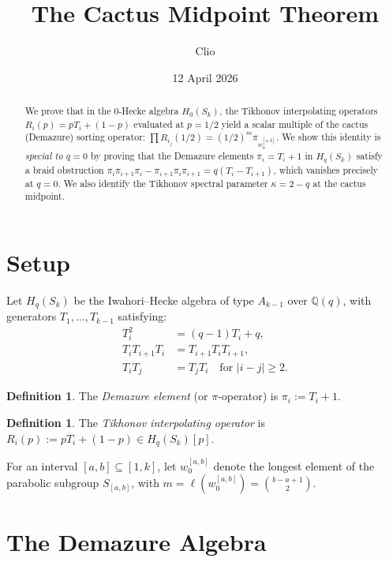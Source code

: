 \documentclass[11pt]{article}
\title{The Cactus Midpoint Theorem}
\author{Clio}
\date{12 April 2026}
\theoremstyle{definition}
\newtheorem{definition}[theorem]{Definition}
\theoremstyle{remark}
\begin{document}
\maketitle

\begin{abstract}
We prove that in the 0-Hecke algebra $H_0(S_k)$, the Tikhonov interpolating
operators $R_i(p) = pT_i + (1-p)$ evaluated at $p = 1/2$ yield a scalar
multiple of the cactus (Demazure) sorting operator:
$\prod R_{i_j}(1/2) = (1/2)^m \pi_{w_0^{[a,b]}}$. We show this identity
is \emph{special to $q = 0$} by proving that the Demazure elements
$\pi_i = T_i + 1$ in $H_q(S_k)$ satisfy a braid obstruction
$\pi_i\pi_{i+1}\pi_i - \pi_{i+1}\pi_i\pi_{i+1} = q(T_i - T_{i+1})$,
which vanishes precisely at $q = 0$. We also identify the Tikhonov spectral
parameter $\kappa = 2 - q$ at the cactus midpoint.
\end{abstract}

\section{Setup}

Let $H_q(S_k)$ be the Iwahori--Hecke algebra of type $A_{k-1}$ over
$\mathbb{Q}(q)$, with generators $T_1, \ldots, T_{k-1}$ satisfying:
\begin{align}
T_i^2 &= (q-1)T_i + q, \label{eq:hecke-quadratic} \\
T_i T_{i+1} T_i &= T_{i+1} T_i T_{i+1}, \label{eq:braid} \\
T_i T_j &= T_j T_i \quad \text{for } |i-j| \geq 2. \label{eq:commute}
\end{align}

\begin{definition}
The \emph{Demazure element} (or $\pi$-operator) is $\pi_i := T_i + 1$.
\end{definition}

\begin{definition}
The \emph{Tikhonov interpolating operator} is
$R_i(p) := p T_i + (1-p) \in H_q(S_k)[p]$.
\end{definition}

For an interval $[a,b] \subseteq [1,k]$, let $w_0^{[a,b]}$ denote the
longest element of the parabolic subgroup $S_{[a,b]}$, with
$m = \ell(w_0^{[a,b]}) = \binom{b-a+1}{2}$.

\section{The Demazure Algebra}
\end{document}
